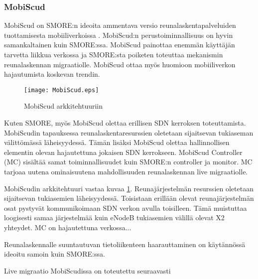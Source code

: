 \subsubsection{MobiScud} \label{mobiscud}
MobiScud on SMORE:n ideoita ammentava versio reunalaskentapalveluiden tuottamisesta mobiiliverkoissa \cite{wang2015mobiscud}.
MobiScud:n perustoiminnallisuus on hyvin samankaltainen kuin SMORE:ssa. MobiScud painottaa enemmän käyttäjän tarvetta liikkua verkossa ja SMORE:sta poiketen toteuttaa mekanismin reunalaskennan migraatiolle. 
MobiScud ottaa myös huomioon mobiiliverkon hajautumista koskevan trendin.

\begin{figure}[tb]
\texttt{[image: MobiScud.eps]}
\caption{MobiScud arkkitehtuuriin } \label{fig:mobiscud}
\end{figure}

Kuten SMORE, myös MobiScud olettaa erillisen SDN kerroksen toteuttamista. MobiScudin tapauksessa reunalaskentaresurssien oletetaan sijaitsevan tukiaseman välittömässä läheisyydessä. Tämän lisäksi MobiScud olettaa hallinnollisen elementin olevan hajautettuna jokaisen SDN kerrokseen. MobiScud Controller (MC) sisältää samat toiminnallisuudet kuin SMORE:n controller ja monitor. 
MC tarjoaa uutena ominaisuutena mahdollisuuden reunalaskennan live migraatiolle.

MobiScudin arkkitehtuuri vastaa kuvaa \ref{fig:mobiscud}. Reunajärjestelmän resurssien oletetaan sijaitsevan tukiasemien läheisyydessä.
Toisistaan erillään olevat reunajärjestelmän osat pystyvät kommunikoimaan SDN verkon avulla toisilleen. Tämä muistuttaa loogisesti samaa järjestelmää kuin eNodeB tukiasemien välillä olevat X2 yhteydet.
MC on hajautettuna verkossa...

Reunalaskennalle suuntautuvan tietoliikenteen haarauttaminen on käytännössä ideoitu samoin kuin SMORE:ssa. 

Live migraatio MobiScudissa on toteutettu seuraavasti




